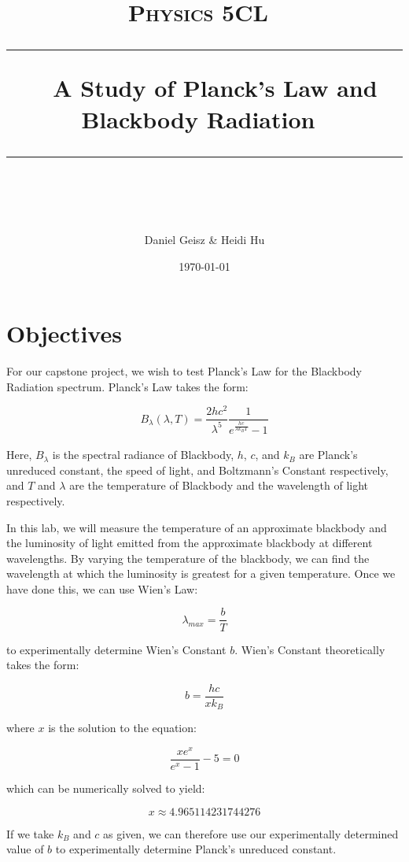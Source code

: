 \documentclass{article}
\title{	
	\normalfont\normalsize
	\textsc{ Physics 5CL}\ %
	\vspace{25pt} %
	\rule{\linewidth}{0.5pt}\ %
	{\huge A Study of Planck’s Law and Blackbody Radiation}\ %
	\rule{\linewidth}{2pt}\ %
}
\author{\LARGE Daniel Geisz \& Heidi Hu} %
\date{\normalsize\today}
\begin{document}
\maketitle 
\section{Objectives} %
\label{sec:objectives}	
For our capstone project, we wish to test Planck’s Law for the Blackbody Radiation spectrum.  Planck's Law takes the form:

$$B_\lambda (\lambda, T) = \frac{2hc^2}{\lambda ^5}\frac{1}{e _{}^{\frac{hc}{\lambda k_B T}}-1}$$

Here, $B_{\lambda}$ is the spectral radiance of Blackbody, $\displaystyle h$, $c$, and $k_B$ are Planck's unreduced constant, the speed of light, and Boltzmann's Constant respectively, and $T$ and $\lambda$ are the temperature of Blackbody and the wavelength of light respectively.


In this lab, we will measure the temperature of an approximate blackbody and the luminosity of light emitted from the approximate blackbody at different wavelengths.   By varying the temperature of the blackbody, we can find the wavelength at which the luminosity is greatest for a given temperature. Once we have done this, we can use Wien's Law:

$$\lambda_{max} = \frac{b}{T}$$

to experimentally determine Wien's Constant $b$.  Wien's Constant theoretically takes the form:

$$b = \frac{hc}{xk_B}$$

where $x$ is the solution to the equation:

$$\frac{xe^x}{e^x - 1} - 5 = 0$$

which can be numerically solved to yield:

$$x \approx 4.965114231744276$$

If we take $k_B$ and $c$ as given, we can therefore use our experimentally determined value of $b$ to experimentally determine Planck's unreduced constant.
 
\end{document}

